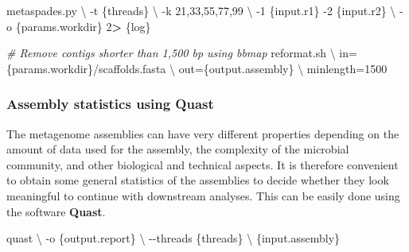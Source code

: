 \documentclass[
]{book}
\newenvironment{Shaded}{\begin{snugshade}}{\end{snugshade}}
\newcommand{\AttributeTok}[1]{\textcolor[rgb]{0.77,0.63,0.00}{#1}}
\newcommand{\CommentTok}[1]{\textcolor[rgb]{0.56,0.35,0.01}{\textit{#1}}}
\newcommand{\DataTypeTok}[1]{\textcolor[rgb]{0.13,0.29,0.53}{#1}}
\newcommand{\DecValTok}[1]{\textcolor[rgb]{0.00,0.00,0.81}{#1}}
\newcommand{\ExtensionTok}[1]{#1}
\newcommand{\NormalTok}[1]{#1}
\newcommand{\OperatorTok}[1]{\textcolor[rgb]{0.81,0.36,0.00}{\textbf{#1}}}
\begin{document}
\begin{Shaded}
\begin{Highlighting}[]
\ExtensionTok{metaspades.py} \DataTypeTok{\textbackslash{}}
    \AttributeTok{{-}t}\NormalTok{ \{threads\} }\DataTypeTok{\textbackslash{}}
    \AttributeTok{{-}k}\NormalTok{ 21,33,55,77,99 }\DataTypeTok{\textbackslash{}}
    \AttributeTok{{-}1}\NormalTok{ \{input.r1\} }\AttributeTok{{-}2}\NormalTok{ \{input.r2\} }\DataTypeTok{\textbackslash{}}
    \AttributeTok{{-}o}\NormalTok{ \{params.workdir\}}
    \DecValTok{2}\OperatorTok{\textgreater{}}\NormalTok{ \{log\}}

\CommentTok{\# Remove contigs shorter than 1,500 bp using bbmap}
\ExtensionTok{reformat.sh} \DataTypeTok{\textbackslash{}}
\NormalTok{    in=\{params.workdir\}/scaffolds.fasta }\DataTypeTok{\textbackslash{}}
\NormalTok{    out=\{output.assembly\} }\DataTypeTok{\textbackslash{}}
\NormalTok{    minlength=1500}
\end{Highlighting}
\end{Shaded}

\normalsize

\hypertarget{assembly-statistics-using-quast}{%
\subsubsection*{Assembly statistics using Quast}\label{assembly-statistics-using-quast}}

The metagenome assemblies can have very different properties depending on the amount of data used for the assembly, the complexity of the microbial community, and other biological and technical aspects. It is therefore convenient to obtain some general statistics of the assemblies to decide whether they look meaningful to continue with downstream analyses. This can be easily done using the software \textbf{Quast}.

\small

\begin{Shaded}
\begin{Highlighting}[]
\ExtensionTok{quast} \DataTypeTok{\textbackslash{}}
    \AttributeTok{{-}o}\NormalTok{ \{output.report\} }\DataTypeTok{\textbackslash{}}
    \AttributeTok{{-}{-}threads}\NormalTok{ \{threads\} }\DataTypeTok{\textbackslash{}}
\NormalTok{    \{input.assembly\}}
\end{Highlighting}
\end{Shaded}

\normalsize
\end{document}
